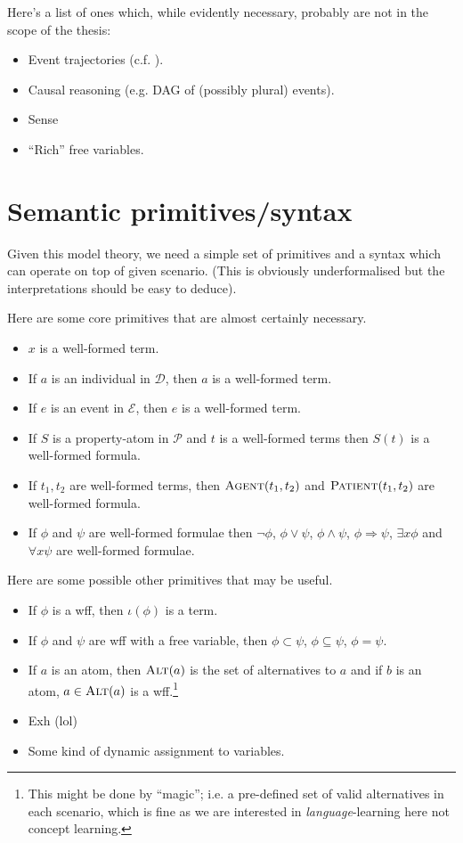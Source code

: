 \documentclass[11pt, a4paper]{article}
\begin{document}
Here's a list of ones which, while evidently necessary, probably are not in the scope of the thesis:
\begin{itemize}
  \item Event trajectories (c.f. \cite{unger_toward_2024}).
  \item Causal reasoning (e.g. DAG of (possibly plural) events).
  \item Sense 
  \item ``Rich'' free variables. 
\end{itemize}

\section{Semantic primitives/syntax}
Given this model theory, we need a simple set of primitives and a syntax which can operate on top of given scenario. 
(This is obviously underformalised but the interpretations should be easy to deduce). 

Here are some core primitives that are almost certainly necessary.
\begin{itemize}
  \item $x$ is a well-formed term.
  \item If $a$ is an individual in $\mathcal{D}$, then $a$ is a well-formed term.
  \item If $e$ is an event in $\mathcal{E}$, then $e$ is a well-formed term.
  \item If $S$ is a property-atom in $\mathcal{P}$ and $t$ is a well-formed terms then $S(t)$ is a well-formed formula.
  \item If $t_1, t_2$ are well-formed terms, then $\textsc{Agent}(t_1, t_2)$ and $\textsc{Patient}(t_1, t_2)$ are well-formed formula. 
  \item If $\phi$ and $\psi$ are well-formed formulae then $\neg\phi$, $\phi\lor\psi$, $\phi\land\psi$, $\phi\Rightarrow\psi$, $\exists x\phi$ and $\forall x\psi$ are well-formed formulae.
\end{itemize}

Here are some possible other primitives that may be useful.
\begin{itemize}
  \item If $\phi$ is a wff, then $\iota(\phi)$ is a term.
  \item If $\phi$ and $\psi$ are wff with a free variable, then $\phi\subset\psi$, $\phi\subseteq\psi$, $\phi=\psi$.
  \item If $a$ is an atom, then $\textsc{Alt}(a)$ is the set of alternatives to $a$ and if $b$ is an atom, $a\in\textsc{Alt}(a)$ is a wff.\footnote{This might be done by ``magic''; i.e. a pre-defined set of valid alternatives in each scenario, which is fine as we are interested in \emph{language}-learning here not concept learning. }
  \item Exh (lol) 
  \item Some kind of dynamic assignment to variables.
\end{itemize}
\end{document}
